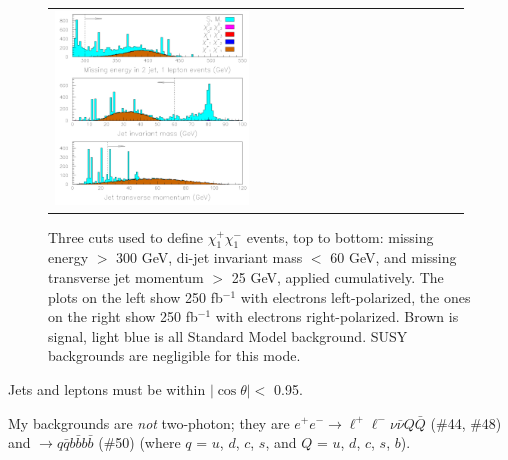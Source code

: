 \documentclass[landscape]{article}
\begin{document}
\begin{figure}[!ht]
\begin{center}
\begin{tabular}{p{0.49\linewidth} p{0.49\linewidth}}
      \begin{minipage}{\linewidth} \includegraphics[width=\linewidth]{charginos_right.pdf} \end{minipage}
    \end{tabular}

    \caption{\large Three cuts used to define $\chi_1^+\chi_1^-$ events, top
    to bottom: missing energy $>$ 300 GeV, di-jet invariant mass $<$
    60 GeV, and missing transverse jet momentum $>$ 25 GeV, applied
    cumulatively.  The plots on the left show 250 fb$^{-1}$ with
    electrons left-polarized, the ones on the right show 250 fb$^{-1}$
    with electrons right-polarized.  Brown is signal, light blue is
    all Standard Model background.  SUSY backgrounds are negligible
    for this mode.}

    \label{jimpcharginocuts}
  \end{center}
\end{figure}

Jets and leptons must be within $|\cos\theta| <$ 0.95.

My backgrounds are {\it not} two-photon; they are $e^+e^- \to
\ell^+\ell^- \nu \bar{\nu} Q \bar{Q}$ (\#44, \#48) and $\to q \bar{q}
b \bar{b} b \bar{b}$ (\#50) (where $q$ = $u$, $d$, $c$, $s$, and $Q$ =
$u$, $d$, $c$, $s$, $b$).

\pagebreak
\end{document}

